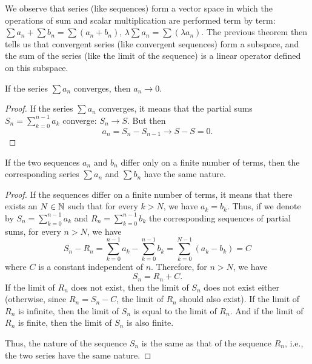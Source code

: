 We observe that series (like sequences) form a vector space in which the
operations of sum and scalar multiplication are performed term by term: $\sum
a_n + \sum b_n = \sum (a_n + b_n)$, $\lambda \sum a_n = \sum (\lambda a_n)$. The
previous theorem then tells us that convergent series (like convergent
sequences) form a subspace, and the sum of the series (like the limit of the
sequence) is a linear operator defined on this subspace.

\begin{theorem}
\mymark{***}
%
If the series $\sum a_n$ converges, then $a_n \to 0$.
\end{theorem}
%
\begin{proof}
\mymark{***}
If the series $\sum a_n$ converges, it means that the partial sums $S_n =
\displaystyle\sum_{k=0}^{n-1} a_k$ converge: $S_n \to S$. But then
\[
  a_n = S_n - S_{n-1} \to S - S = 0.
\]
\end{proof}

\begin{theorem}%
%
%
%
%
If the two sequences $a_n$ and $b_n$ differ only on a finite number
%
of terms, then the corresponding series $\sum a_n$ and $\sum b_n$ have the same
nature.
\end{theorem}
%
\begin{proof}
If the sequences differ on a finite number of terms, it means that there exists
an $N\in {\mathbb N}$ such that for every $k>N$, we have $a_k=b_k$. Thus, if we denote
by $S_n = \sum_{k=0}^{n-1} a_k$ and $R_n = \sum_{k=0}^{n-1} b_k$ the
corresponding sequences of partial sums, for every $n>N$, we have
\[
  S_n - R_n
    = \sum_{k=0}^{n-1} a_k - \sum_{k=0}^{n-1} b_k
    = \sum_{k=0}^{N-1} (a_k - b_k) 
    = C
\]
where $C$ is a constant independent of $n$. Therefore, for $n>N$, we have
\[
  S_n = R_n + C.
\]
If the limit of $R_n$ does not exist, then the limit of $S_n$ does not exist
either (otherwise, since $R_n = S_n -C$, the limit of $R_n$ should also exist).
If the limit of $R_n$ is infinite, then the limit of $S_n$ is equal to the limit
of $R_n$. And if the limit of $R_n$ is finite, then the limit of $S_n$ is also
finite.

Thus, the nature of the sequence $S_n$ is the same as that of the sequence
$R_n$, i.e., the two series have the same nature.
\end{proof}

